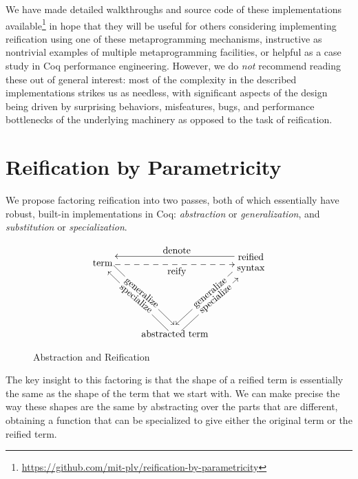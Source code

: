 We have made detailed walkthroughs and source code of these implementations available\footnote{\url{https://github.com/mit-plv/reification-by-parametricity}} in hope that they will be useful for others considering implementing reification using one of these metaprogramming mechanisms, instructive as nontrivial examples of multiple metaprogramming facilities, or helpful as a case study in Coq performance engineering.
However, we do \emph{not} recommend reading these out of general interest:
most of the complexity in the described implementations strikes us as needless,
with significant aspects of the design being driven by surprising behaviors, misfeatures, bugs, and performance bottlenecks of the underlying machinery as opposed to the task of reification.

\section{Reification by Parametricity} \label{sec:reification-by-parametricity}

We propose factoring reification into two passes, both of which essentially have robust, built-in implementations in Coq: \emph{abstraction} or \emph{generalization}, and \emph{substitution} or \emph{specialization}.


\begin{figure}
    \[
    \xymatrix{
        \txt{term}
        \ar@<1ex>[ddr]|{\txt{\rotatebox{-40}{generalize}}}
        \ar@<-1ex>@{-->}[rr]_{\txt{reify}}
        &&
        \txt{reified \\ syntax}
        \ar@<-1ex>[ll]_{\txt{denote}}
        \ar@<-1ex>[ddl]|{\txt{\rotatebox{40}{generalize}}}
        \\ \\
        &
        \txt{abstracted term}
        \ar@<1ex>[uul]|{\txt{\rotatebox{-40}{specialize}}}
        \ar@<-1ex>[uur]|{\txt{\rotatebox{40}{specialize}}}
    }
    \]
    \caption{Abstraction and Reification}\label{fig:denote-reify}
\end{figure}

The key insight to this factoring is that the shape of a reified term is essentially the same as the shape of the term that we start with.
We can make precise the way these shapes are the same by abstracting over the parts that are different, obtaining a function that can be specialized to give either the original term or the reified term.

